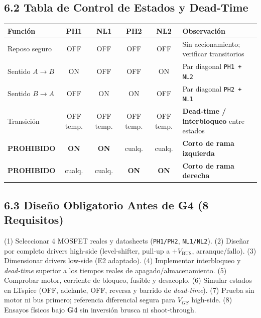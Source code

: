 \documentclass[10pt, a4paper, landscape]{article}
\begin{document}
\begin{minipage}[t]{0.50\linewidth}
\subsection*{6.2 Tabla de Control de Estados y Dead-Time}
\par\vspace{0.05cm}\noindent
\renewcommand{\arraystretch}{1.15}
{\footnotesize
\begin{tabularx}{\linewidth}{|l|c|c|c|c|>{\raggedright\arraybackslash}X|}
\hline
\rowcolor{ucbgray}
\textbf{Función} & \textbf{PH1} & \textbf{NL1} & \textbf{PH2} & \textbf{NL2} & \textbf{Observación} \\ \hline
Reposo seguro & OFF & OFF & OFF & OFF & Sin accionamiento; verificar transitorios \\ \hline
Sentido $A \rightarrow B$ & ON & OFF & OFF & ON & Par diagonal \texttt{PH1 + NL2} \\ \hline
Sentido $B \rightarrow A$ & OFF & ON & ON & OFF & Par diagonal \texttt{PH2 + NL1} \\ \hline
Transición & OFF temp. & OFF temp. & OFF temp. & OFF temp. & \textbf{Dead-time / interbloqueo} entre estados \\ \hline
\textcolor{warnred}{\textbf{PROHIBIDO}} & \textcolor{warnred}{\textbf{ON}} & \textcolor{warnred}{\textbf{ON}} & cualq. & cualq. & \textbf{Corto de rama izquierda} \\ \hline
\textcolor{warnred}{\textbf{PROHIBIDO}} & cualq. & cualq. & \textcolor{warnred}{\textbf{ON}} & \textcolor{warnred}{\textbf{ON}} & \textbf{Corto de rama derecha} \\ \hline
\end{tabularx}
}

\subsection*{6.3 Diseño Obligatorio Antes de G4 (8 Requisitos)}
{\footnotesize
(1) Seleccionar 4 MOSFET reales y datasheets (\texttt{PH1/PH2}, \texttt{NL1/NL2}). (2) Diseñar por completo drivers high-side (level-shifter, pull-up a $+V_{\text{BUS}}$, arranque/fallo). (3) Dimensionar drivers low-side (E2 adaptado). (4) Implementar interbloqueo y \textit{dead-time} superior a los tiempos reales de apagado/almacenamiento. (5) Comprobar motor, corriente de bloqueo, fusible y desacoplo. (6) Simular estados en LTspice (OFF, adelante, OFF, reversa y barrido de \textit{dead-time}). (7) Prueba sin motor ni bus primero; referencia diferencial segura para $V_{GS}$ high-side. (8) Ensayos físicos bajo \textbf{G4} sin inversión brusca ni shoot-through.
}
\end{minipage}
\end{document}
